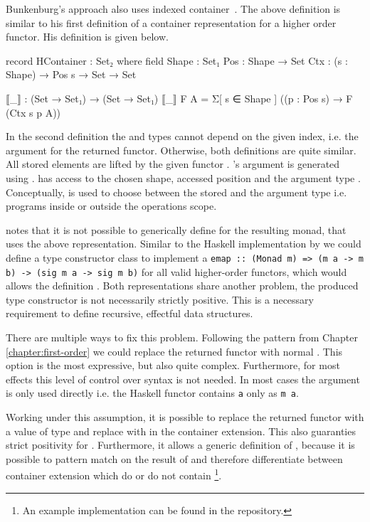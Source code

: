 Bunkenburg's approach also uses indexed container~\cite{bunkenburg2019modeling}.
The above definition is similar to his first definition of a container
representation for a higher order functor.
His definition is given below.
\begin{code}
record HContainer : Set₂ where
  field
    Shape : Set₁
    Pos : Shape → Set
    Ctx : (s : Shape) → Pos s → Set → Set

  ⟦_⟧ : (Set → Set₁) → (Set → Set₁)
  ⟦_⟧ F A = Σ[ s ∈ Shape ] ((p : Pos s) → F (Ctx s p A))
\end{code}
In the second definition the  and  types cannot
depend on the given index, i.e. the argument for the returned functor.
Otherwise, both definitions are quite similar.
All stored elements are lifted by the given functor .
's argument is generated using .
 has access to the chosen shape, accessed position and the 
argument type .
Conceptually,  is used to choose between the stored
 and the argument type  i.e. programs inside or
outside the operations scope.

\textcite{bunkenburg2019modeling} notes that it is not possible to generically
define \AgdaFunction{>>=} for the resulting monad, that uses the above
representation.
Similar to the Haskell implementation by \textcite{DBLP:conf/haskell/WuSH14} we
could define a type constructor class to implement a
\texttt{emap :: (Monad m) => (m a -> m b) -> (sig m a
-> sig m b)}
for all valid higher-order functors, which would allows the definition
\AgdaFunction{>>=}.
Both representations share another problem, the produced type constructor is not
necessarily strictly positive.
This is a necessary requirement to define recursive, effectful data structures.

There are multiple ways to fix this problem.
Following the pattern from Chapter \ref{chapter:first-order} we could replace
the returned functor with normal .
This option is the most expressive, but also quite complex.
Furthermore, for most effects this level of control over syntax is not needed.
In most cases the argument  is only used directly i.e. the
Haskell functor contains \texttt{a} only as \texttt{m a}.

Working under this assumption, it is possible to replace the returned functor
with a value of type \AgdaSpace{} and
replace  with  in the
container extension.
This also guaranties strict positivity for .
Furthermore, it allows a generic definition of \AgdaFunction{>>=}, because it is
possible to pattern match on the result of  and therefore
differentiate between container extension which do or do not contain
\footnote{An example implementation can be found in the
  repository.}.
 

